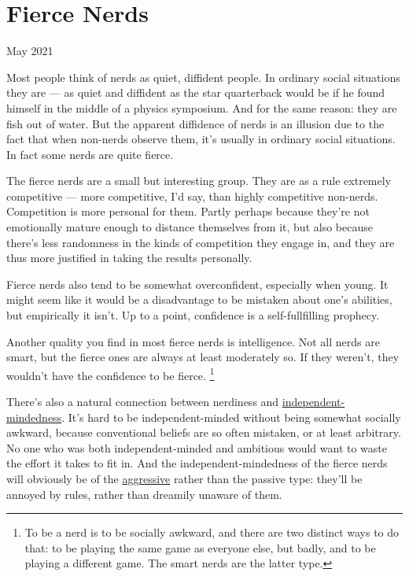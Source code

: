 \chapter{Fierce Nerds}

May 2021

Most people think of nerds as quiet, diffident people. In ordinary
social situations they are --- as quiet and diffident as the star
quarterback would be if he found himself in the middle of a physics
symposium. And for the same reason: they are fish out of water. But the
apparent diffidence of nerds is an illusion due to the fact that when
non-nerds observe them, it's usually in ordinary social situations. In
fact some nerds are quite fierce.

The fierce nerds are a small but interesting group. They are as a rule
extremely competitive --- more competitive, I'd say, than highly
competitive non-nerds. Competition is more personal for them. Partly
perhaps because they're not emotionally mature enough to distance
themselves from it, but also because there's less randomness in the
kinds of competition they engage in, and they are thus more justified in
taking the results personally.

Fierce nerds also tend to be somewhat overconfident, especially when
young. It might seem like it would be a disadvantage to be mistaken
about one's abilities, but empirically it isn't. Up to a point,
confidence is a self-fullfilling prophecy.

Another quality you find in most fierce nerds is intelligence. Not all
nerds are smart, but the fierce ones are always at least moderately so.
If they weren't, they wouldn't have the confidence to be fierce.
\footnote{To be a nerd is to be socially awkward, and there are two
distinct ways to do that: to be playing the same game as everyone else,
but badly, and to be playing a different game. The smart nerds are the
latter type.}

There's also a natural connection between nerdiness and
\href{think.html}{independent-mindedness}. It's hard to be
independent-minded without being somewhat socially awkward, because
conventional beliefs are so often mistaken, or at least arbitrary. No
one who was both independent-minded and ambitious would want to waste
the effort it takes to fit in. And the independent-mindedness of the
fierce nerds will obviously be of the \href{conformism.html}{aggressive}
rather than the passive type: they'll be annoyed by rules, rather than
dreamily unaware of them.

